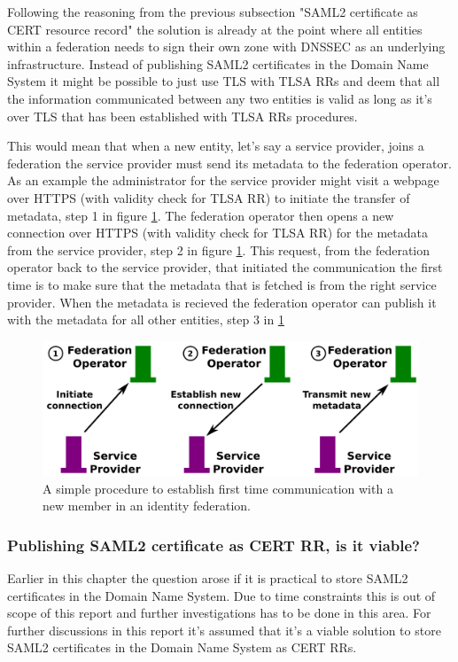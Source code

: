 Following the reasoning from the previous subsection "SAML2 certificate as CERT resource record" the solution is already at the point where all entities within a federation needs to sign their own zone with DNSSEC as an underlying infrastructure.
Instead of publishing SAML2 certificates in the Domain Name System it might be possible to just use TLS with TLSA RRs and deem that all the information communicated between any two entities is valid as long as it's over TLS that has been established with TLSA RRs procedures.

This would mean that when a new entity, let's say a service provider, joins a federation the service provider must send its metadata to the federation operator.
As an example the administrator for the service provider might visit a webpage over HTTPS (with validity check for TLSA RR) to initiate the transfer of metadata, step 1 in figure \ref{ch4:onlyUseTLS}.
The federation operator then opens a new connection over HTTPS (with validity check for TLSA RR) for the metadata from the service provider, step 2 in figure \ref{ch4:onlyUseTLS}.
This request, from the federation operator back to the service provider, that initiated the communication the first time is to make sure that the metadata that is fetched is from the right service provider. 
When the metadata is recieved the federation operator can publish it with the metadata for all other entities, step 3 in \ref{ch4:onlyUseTLS}

\begin{figure}[ht]
\begin{center}
\includegraphics[scale=1]{Figures/onlyUseTLS.png}
\end{center}
\caption{A simple procedure to establish first time communication with a new member in an identity federation.
\label{ch4:onlyUseTLS}}
\end{figure}

%

\subsubsection{Publishing SAML2 certificate as CERT RR, is it viable?}
\label{subsec:saml2-certs-in-cert-rr}
Earlier in this chapter the question arose if it is practical to store SAML2 certificates in the Domain Name System.
Due to time constraints this is out of scope of this report and further investigations has to be done in this area.
For further discussions in this report it's assumed that it's a viable solution to store SAML2 certificates in the Domain Name System as CERT RRs.

